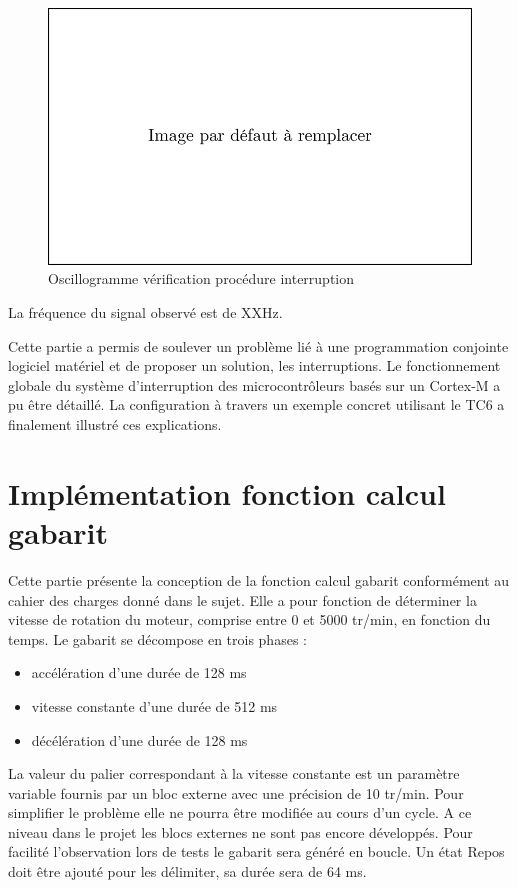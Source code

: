 \documentclass[a4paper]{article}
\begin{document}
	\begin{figure}[H]
		\centering
		\includegraphics[width=0.5\linewidth]{defaut}
		\caption{Oscillogramme vérification procédure interruption}
	\end{figure}
	La fréquence du signal observé est de XXHz. 
	
	Cette partie a permis de soulever un problème lié à une programmation conjointe logiciel matériel et de proposer un solution, les interruptions. Le fonctionnement globale du système d'interruption des microcontrôleurs basés sur un Cortex-M a pu être détaillé. La configuration à travers un exemple concret utilisant le TC6 a finalement illustré ces explications. 
	
	
	
	\newpage
	\section{Implémentation fonction calcul gabarit}
	Cette partie présente la conception de la fonction calcul gabarit conformément au cahier des charges donné dans le sujet. Elle a pour fonction de déterminer la vitesse de rotation du moteur, comprise entre 0 et 5000 tr/min, en fonction du temps. Le gabarit se décompose en trois phases :
	\begin{itemize}
		\item accélération d'une durée de 128 ms
		\item vitesse constante d'une durée de 512 ms
		\item décélération d'une durée de 128 ms
	\end{itemize}
	La valeur du palier correspondant à la vitesse constante est un paramètre variable fournis par un bloc externe avec une précision de 10 tr/min. Pour simplifier le problème elle ne pourra être modifiée au cours d'un cycle. A ce niveau dans le projet les blocs externes ne sont pas encore développés. Pour facilité l'observation lors de tests le gabarit sera généré en boucle. Un état Repos doit être ajouté pour les délimiter, sa durée sera de 64 ms.
\end{document}
